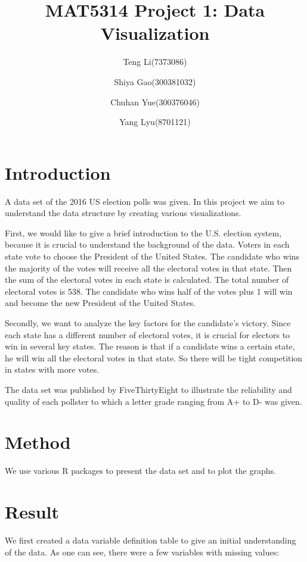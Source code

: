 \documentclass[
]{article}
\title{MAT5314 Project 1: Data Visualization}
\author{Teng Li(7373086) \and Shiya Gao(300381032) \and Chuhan
Yue(300376046) \and Yang Lyu(8701121)}
\date{}
\begin{document}
\maketitle

\hypertarget{introduction}{%
\section{Introduction}\label{introduction}}

A data set of the 2016 US election polls was given. In this project we
aim to understand the data structure by creating various visualizations.

First, we would like to give a brief introduction to the U.S. election
system, because it is crucial to understand the background of the data.
Voters in each state vote to choose the President of the United States.
The candidate who wins the majority of the votes will receive all the
electoral votes in that state. Then the sum of the electoral votes in
each state is calculated. The total number of electoral votes is 538.
The candidate who wins half of the votes plus 1 will win and become the
new President of the United States.

Secondly, we want to analyze the key factors for the candidate's
victory. Since each state has a different number of electoral votes, it
is crucial for electors to win in several key states. The reason is that
if a candidate wins a certain state, he will win all the electoral votes
in that state. So there will be tight competition in states with more
votes.

The data set was published by FiveThirtyEight to illustrate the
reliability and quality of each pollster to which a letter grade ranging
from A+ to D- was given.

\hypertarget{method}{%
\section{Method}\label{method}}

We use various R packages to present the data set and to plot the
graphs.

\hypertarget{result}{%
\section{Result}\label{result}}

We first created a data variable definition table to give an initial
understanding of the data. As one can see, there were a few variables
with missing values:
\end{document}
